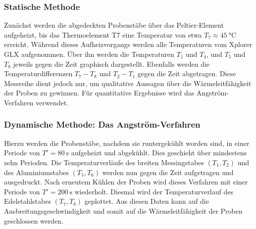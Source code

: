 \subsubsection{Statische Methode}
\label{sec:stat}
Zunächst werden die abgedeckten Probenstäbe über das Peltier-Element aufgeheizt, bis das Thermoelement T7 eine Temperatur von etwa $T_7 \approx \SI{45}{\celsius}$ erreicht.
Während dieses Aufheizvorgangs werden alle Temperaturen vom Xplorer GLX aufgenommen.
Über ihn werden die Temperaturen $T_1$ und $T_4$, und $T_5$ und $T_8$ jeweils gegen die Zeit graphisch dargestellt.
Ebenfalls werden die Temperaturdifferenzen $T_7-T_8$ und $T_2-T_1$ gegen die Zeit abgetragen.
Diese Messreihe dient jedoch nur, um qualitative Aussagen über die Wärmeleitfähigkeit der Proben zu gewinnen.
Für quantitative Ergebnisse wird das Angström-Verfahren verwendet.

\subsubsection{Dynamische Methode: Das Angström-Verfahren}

Hierzu werden die Probenstäbe, nachdem sie runtergekühlt worden sind, in einer Periode von $T'=\SI{80}{\second}$ aufgeheizt und abgekühlt.
Dies geschieht über mindestens zehn Perioden.
Die Temperaturverläufe des breiten Messingstabes $(T_1,T_2)$ und des Aluminiumstabes $(T_5,T_6)$ werden nun gegen die Zeit aufgetragen und ausgedruckt.
Nach erneutem Kühlen der Proben wird dieses Verfahren mit einer Periode von $T' = \SI{200}{\second}$ wiederholt.
Diesmal wird der Temperaturverlauf des Edelstahlstabes $(T_7,T_8)$ geplottet.
Aus diesen Daten kann auf die Ausbreitungsgeschwindigkeit und somit auf die Wärmeleitfähigkeit der Proben geschlossen werden.
